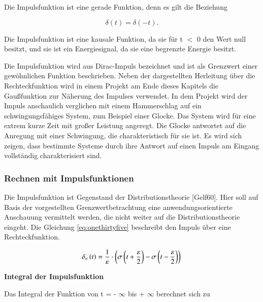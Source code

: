\clearpage

\noindent Die Impulsfunktion ist eine gerade Funktion, denn es gilt die Beziehung 

\begin{equation}\label{eq:onethirtyseven}
\delta \left(t\right)=\delta \left(-t\right).
\end{equation}


\noindent Die Impulsfunktion ist eine kausale Funktion, da sie f\"{u}r t $\mathrm{<}$ 0 den Wert null besitzt, und sie ist ein Energiesignal, da sie eine begrenzte Energie besitzt.

\noindent Die Impulsfunktion wird aus Dirac-Impuls bezeichnet und ist als Grenzwert einer gew\"{o}hnlichen Funktion beschrieben. Neben der dargestellten Herleitung \"{u}ber die Rechteckfunktion wird in einem Projekt am Ende dieses Kapitels die Gau{\ss}funktion zur N\"{a}herung des Impulses verwendet. In dem Projekt wird der Impuls anschaulich verglichen mit einem Hammerschlag auf ein schwingungsf\"{a}higes System, zum Beispiel einer Glocke. Das System wird f\"{u}r eine extrem kurze Zeit mit gro{\ss}er Leistung angeregt. Die Glocke antwortet auf die Anregung mit einer Schwingung, die charakteristisch f\"{u}r sie ist. Es wird sich zeigen, dass bestimmte Systeme durch ihre Antwort auf einen Impuls am Eingang vollst\"{a}ndig charakterisiert sind.


\subsubsection{ Rechnen mit Impulsfunktionen}

\noindent Die Impulsfunktion ist Gegenstand der Distributionstheorie [Gelf60]. Hier soll auf Basis der vorgestellten Grenzwertbetrachtung eine anwendungsorientierte Anschauung vermittelt werden, die nicht weiter auf die Distributionstheorie eingeht. Die Gleichung \ref{eq:onethirtyfive} beschreibt den Impuls \"{u}ber eine Rechteckfunktion.

\begin{equation}\label{eq:onethirtyeight}
\delta _{\varepsilon } \left(t\right)=\dfrac{1}{\varepsilon } \cdot \left(\sigma \left(t+\dfrac{\varepsilon }{2} \right)-\sigma \left(t-\dfrac{\varepsilon }{2} \right)\right) \\
\end{equation}
\bigskip

{\selectfont
\noindent\textbf{Integral der Impulsfunktion}} \smallskip

\noindent Das Integral der Funktion von t = - $\infty$ bis + $\infty$ berechnet sich zu

